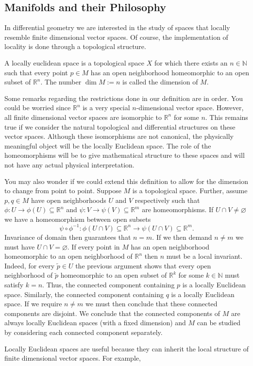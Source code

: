 \subsection{Manifolds and their Philosophy}

In differential geometry we are interested in the study of spaces that locally resemble finite dimensional vector spaces. Of course, the implementation of locality is done through a topological structure. 

\begin{definition}

	A locally euclidean space is a topological space $X$ for which there exists an $n\in\mathbb{N}$ such that every point $p\in M$ has an open neighborhood homeomorphic to an open subset of $\mathbb{R}^n$. The number $\dim M:=n$ is called the dimension of $M$.

\end{definition}

Some remarks regarding the restrictions done in our definition are in order. You could be worried since $\mathbb{R}^n$ is a very special $n$-dimensional vector space. However, all finite dimensional vector spaces are isomorphic to $\mathbb{R}^n$ for some $n$. This remains true if we consider the natural topological and differential structures on these vector spaces. Although these isomorphisms are not canonical, the physically meaningful object will be the locally Euclidean space. The role of the homeomorphisms will be to give mathematical structure to these spaces and will not have any actual physical interpretation.

You may also wonder if we could extend this definition to allow for the dimension to change from point to point. Suppose $M$ is a topological space. Further, assume $p,q\in M$ have open neighborhoods $U$ and $V$ respectively such that $\phi:U\rightarrow\phi(U)\subseteq\mathbb{R}^n$ and $\psi:V\rightarrow\psi(V)\subseteq\mathbb{R}^m$ are homeomorphisms. If $U\cap V\neq\varnothing$ we have a homeomorphism between open subsets 
\begin{equation}
\psi\circ\phi^{-1}:\phi(U\cap V)\subseteq\mathbb{R}^n\rightarrow \psi(U\cap V)\subseteq\mathbb{R}^m.
\end{equation}
Invariance of domain then guarantees that $n=m$. If we then demand $n\neq m$ we must have $U\cap V=\varnothing$. If every point in $M$ has an open neighborhood homeomorphic to an open neighborhood of $\mathbb{R}^n$ then $n$ must be a local invariant. Indeed, for every $\tilde{p}\in U$ the previous argument shows that every open neighborhood of $\tilde{p}$ homeomorphic to an open subset of $\mathbb{R}^k$ for some $k\in\mathbb{N}$ must satisfy $k=n$. Thus, the connected component containing $p$ is a locally Euclidean space. Similarly, the connected component containing $q$ is a locally Euclidean space. If we require $n\neq m$ we must then conclude that these connected components are disjoint. We conclude that the connected components of $M$ are always locally Euclidean spaces (with a fixed dimension) and $M$ can be studied by considering each connected component separately.

Locally Euclidean spaces are useful because they can inherit the local structure of finite dimensional vector spaces. For example, 

 